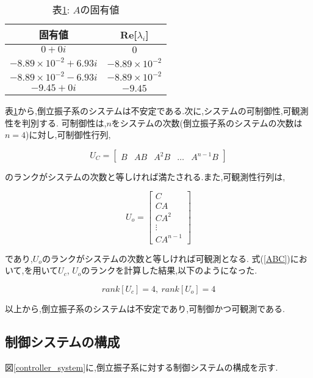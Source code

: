 \begin{table}[htbp]
    \begin{center}
        \caption{表\ref{eigen_A}: $A$の固有値}
        \begin{tabular}{|c|c|} \hline
            固有値 & Re[$\lambda_{i}$] \\ \hline \hline
            $0 + 0i$ & $0$ \\ \hline
            $-8.89 \times 10^{-2} + 6.93i$ & $-8.89 \times 10^{-2}$ \\ \hline
            $-8.89 \times 10^{-2} - 6.93i$ & $-8.89 \times 10^{-2}$ \\ \hline
            $-9.45 + 0i$ & $-9.45$ \\ \hline
        \end{tabular}
        \label{eigen_A}
    \end{center}
\end{table}

表\ref{eigen_A}から,倒立振子系のシステムは不安定である.次に,システムの可制御性,可観測性を判別する.
可制御性は,$n$をシステムの次数(倒立振子系のシステムの次数は$n = 4$)に対し,可制御性行列,

$$
    U_{C} =
    \left[
        \begin{array}{ccccc}
            B  &  AB  &  A^2B  &  \dots  &  A^{n-1}B
        \end{array}
    \right]
$$

のランクがシステムの次数と等しければ満たされる.また,可観測性行列は,

$$
    U_{o} = 
    \left[
        \begin{array}{c}
            C \\
            CA \\
            CA^2 \\
            \vdots \\
            CA^{n-1}
        \end{array}
    \right]
$$

であり,$U_{o}$のランクがシステムの次数と等しければ可観測となる.
式(\ref{ABC})において,\MaTX{}を用いて$U_{c}$, $U_{o}$のランクを計算した結果,以下のようになった.

$$
    rank[U_c] = 4,\ rank[U_o] = 4
$$

以上から,倒立振子系のシステムは不安定であり,可制御かつ可観測である.

\subsection{制御システムの構成}
図\ref{controller_system}に,倒立振子系に対する制御システムの構成を示す.

